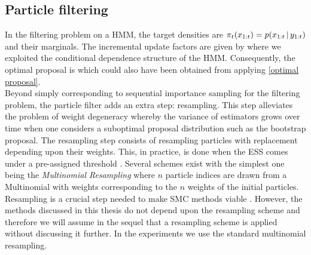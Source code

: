 \subsection{Particle filtering}
In the filtering problem on a HMM, the target densities are $\pi_{t}(x_{1:t})=p(x_{1:t}\,|\, y_{1:t})$ and their marginals. The incremental update factors are given by
where we exploited the conditional dependence structure of the HMM. 
Consequently, the optimal proposal is
which could also have been obtained from applying \eqref{optimal proposal}.\\
Beyond simply corresponding to sequential importance sampling for the filtering problem, the particle filter adds an extra step: resampling. 
This step alleviates the problem of weight degeneracy whereby the variance of estimators grows over time when one considers a suboptimal proposal distribution such as the bootstrap proposal. 
The resampling step consists of resampling particles with replacement depending upon their weights.
This, in practice, is done when the ESS comes under a pre-assigned threshold \citep{delmoral06}.
Several schemes exist with the simplest one being the \emph{Multinomial Resampling} where $n$ particle indices are drawn from a Multinomial with weights corresponding to the $n$ weights of the initial particles.\\
Resampling is a crucial step needed to make SMC methods viable \citep{hol06, doucet11}. However, the methods discussed in this thesis do not depend upon the resampling scheme and therefore we will assume in the sequel that a resampling scheme is applied without discussing it further. In the experiments we use the standard multinomial resampling.


